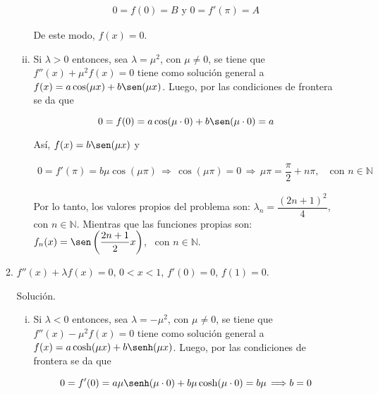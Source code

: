 \documentclass[fleqn]{article}
\newcommand{\nat}{\mathbb{N}}
\begin{document}
\begin{enumerate}[I.]
\begin{enumerate}
\begin{enumerate}[i)]
				\begin{align*}
					0 = f(0) = B \mbox{ y } 0 = f'(\pi) = A
				\end{align*}

				De este modo, $ f(x) = 0 $.
				
				\item Si $ \lambda > 0 $ entonces, sea $ \lambda = \mu^2 $, con $ \mu \neq 0 $, se tiene que $ f''(x) + \mu^2 f(x) = 0 $
				tiene como solución general a $ f(x) = a \cos(\mu x) + b \sen(\mu x) $. Luego, por las condiciones de frontera se da que
				
				\begin{equation*}
					0 = f(0) = a \cos(\mu \cdot 0) + b \sen(\mu \cdot 0) = a
				\end{equation*}

				Así, $ f(x) = b \sen(\mu x) $ y 

				\begin{align*}
					0 = f'(\pi) = b \mu \cos(\mu \pi) \, \Longrightarrow \, \cos(\mu \pi) = 0 \, \Longrightarrow \, \mu \pi = \dfrac{\pi}{2} + n \pi, \quad \mbox{con } n \in \nat
				\end{align*}
				
				Por lo tanto, los valores propios del problema son: $ \lambda_n = \dfrac{(2n + 1)^2}{4} $, \, con $ n \in \nat $. Mientras que las funciones propias son: $ f_n (x) = \sen \left( \dfrac{2n + 1}{2} x \right) $, \, con $ n \in \nat $.
			\end{enumerate}


			\bfseries
			
			\item $ f''(x) + \lambda f(x) = 0 $, $ 0 < x < 1 $, $ f'(0) = 0 $, $ f(1) = 0 $.
			
			Solución.
			
			\normalfont

			\begin{enumerate}[i)]
				\item Si $ \lambda < 0 $ entonces, sea $ \lambda = - \mu^2 $, con $ \mu \neq 0 $, se tiene que $ f''(x) - \mu^2 f(x) = 0 $
				tiene como solución general a $ f(x) = a \cosh(\mu x) + b \senh(\mu x) $. Luego, por las condiciones de frontera se da que
				
				\begin{equation*}
					0 = f'(0) = a \mu \senh(\mu \cdot 0) + b \mu \cosh(\mu \cdot 0) = b \mu \, \Longrightarrow b = 0
				\end{equation*}


\end{enumerate}
\end{enumerate}
\end{enumerate}
\end{document}
